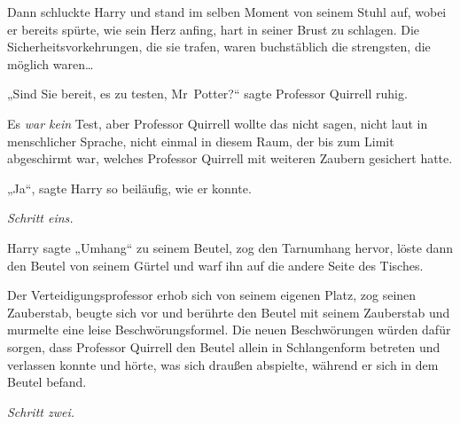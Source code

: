 Dann schluckte Harry und stand im selben Moment von seinem Stuhl auf, wobei er bereits spürte, wie sein Herz anfing, hart in seiner Brust zu schlagen. Die Sicherheitsvorkehrungen, die sie trafen, waren buchstäblich die strengsten, die möglich waren…

„Sind Sie bereit, es zu testen, Mr~Potter?“ sagte Professor Quirrell ruhig.

Es \emph{war kein} Test, aber Professor Quirrell wollte das nicht sagen, nicht laut in menschlicher Sprache, nicht einmal in diesem Raum, der bis zum Limit abgeschirmt war, welches Professor Quirrell mit weiteren Zaubern gesichert hatte.

„Ja“, sagte Harry so beiläufig, wie er konnte.

\emph{Schritt eins.}

Harry sagte „Umhang“ zu seinem Beutel, zog den Tarnumhang hervor, löste dann den Beutel von seinem Gürtel und warf ihn auf die andere Seite des Tisches.

Der Verteidigungsprofessor erhob sich von seinem eigenen Platz, zog seinen Zauberstab, beugte sich vor und berührte den Beutel mit seinem Zauberstab und murmelte eine leise Beschwörungsformel. Die neuen Beschwörungen würden dafür sorgen, dass Professor Quirrell den Beutel allein in Schlangenform betreten und verlassen konnte und hörte, was sich draußen abspielte, während er sich in dem Beutel befand.

\emph{Schritt zwei.}

